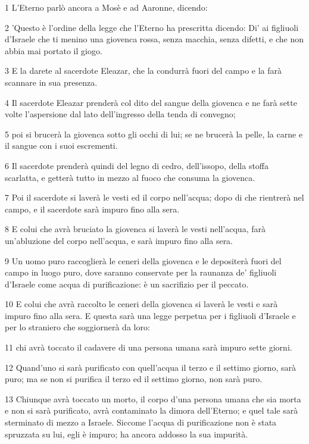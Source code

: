 \par 1 L'Eterno parlò ancora a Mosè e ad Aaronne, dicendo:
\par 2 'Questo è l'ordine della legge che l'Eterno ha prescritta dicendo: Di' ai figliuoli d'Israele che ti menino una giovenca rossa, senza macchia, senza difetti, e che non abbia mai portato il giogo.
\par 3 E la darete al sacerdote Eleazar, che la condurrà fuori del campo e la farà scannare in sua presenza.
\par 4 Il sacerdote Eleazar prenderà col dito del sangue della giovenca e ne farà sette volte l'aspersione dal lato dell'ingresso della tenda di convegno;
\par 5 poi si brucerà la giovenca sotto gli occhi di lui; se ne brucerà la pelle, la carne e il sangue con i suoi escrementi.
\par 6 Il sacerdote prenderà quindi del legno di cedro, dell'issopo, della stoffa scarlatta, e getterà tutto in mezzo al fuoco che consuma la giovenca.
\par 7 Poi il sacerdote si laverà le vesti ed il corpo nell'acqua; dopo di che rientrerà nel campo, e il sacerdote sarà impuro fino alla sera.
\par 8 E colui che avrà bruciato la giovenca si laverà le vesti nell'acqua, farà un'abluzione del corpo nell'acqua, e sarà impuro fino alla sera.
\par 9 Un uomo puro raccoglierà le ceneri della giovenca e le depositerà fuori del campo in luogo puro, dove saranno conservate per la raunanza de' figliuoli d'Israele come acqua di purificazione: è un sacrifizio per il peccato.
\par 10 E colui che avrà raccolto le ceneri della giovenca si laverà le vesti e sarà impuro fino alla sera. E questa sarà una legge perpetua per i figliuoli d'Israele e per lo straniero che soggiornerà da loro:
\par 11 chi avrà toccato il cadavere di una persona umana sarà impuro sette giorni.
\par 12 Quand'uno si sarà purificato con quell'acqua il terzo e il settimo giorno, sarà puro; ma se non si purifica il terzo ed il settimo giorno, non sarà puro.
\par 13 Chiunque avrà toccato un morto, il corpo d'una persona umana che sia morta e non si sarà purificato, avrà contaminato la dimora dell'Eterno; e quel tale sarà sterminato di mezzo a Israele. Siccome l'acqua di purificazione non è stata spruzzata su lui, egli è impuro; ha ancora addosso la sua impurità.
